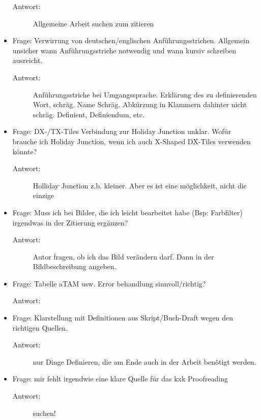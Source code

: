 \begin{itemize}
    \begin{description}
      \item[Antwort:] Allgemeine Arbeit suchen zum zitieren
    \end{description}
    \item Frage: Verwirrung von deutschen/englischen Anführungsstrichen. Allgemein unsicher wann Anführungsstriche notwendig und wann kursiv schreiben ausreicht.
    \begin{description}
      \item[Antwort:] Anführungsstriche bei Umgangssprache. Erklärung des zu definierenden Wort, schräg. Name Schräg. Abkürzung in Klammern dahinter nicht schräg. Definient, Definiendum, etc.
    \end{description}
    \item Frage: DX-/TX-Tiles Verbindung zur Holiday Junction unklar. Wofür brauche ich Holiday Junction, wenn ich auch X-Shaped DX-Tiles verwenden könnte?
    \begin{description}
      \item[Antwort:] Holliday Junction z.b. kleiner. Aber es ist eine möglichkeit, nicht die einzige
    \end{description}
    \item Frage: Muss ich bei Bilder, die ich leicht bearbeitet habe (Bsp: Farbfilter) irgendwas in der Zitierung ergänzen?
    \begin{description}
      \item[Antwort:] Autor fragen, ob ich das Bild verändern darf. Dann in der Bildbeschreibung angeben.
    \end{description}
    \item Frage: Tabelle aTAM usw. Error behandlung sinnvoll/richtig?
    \begin{description}
      \item[Antwort:]
    \end{description}
    \item Frage: Klarstellung mit Definitionen aus Skript/Buch-Draft wegen den richtigen Quellen.
    \begin{description}
      \item[Antwort:] nur Dinge Definieren, die am Ende auch in der Arbeit benötigt werden.
    \end{description}
    \item Frage: mir fehlt irgendwie eine klare Quelle für das kxk Proofreading
    \begin{description}
      \item[Antwort:] suchen!

\end{description}
\end{itemize}
